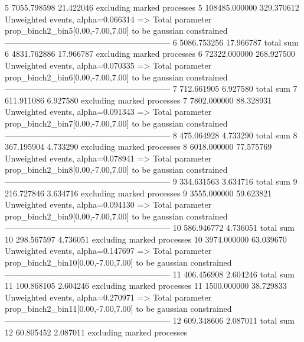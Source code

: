 5          7055.798598     21.422046       excluding marked processes    
5          108485.000000   329.370612      Unweighted events, alpha=0.066314
  => Total parameter prop_binch2_bin5[0.00,-7.00,7.00] to be gaussian constrained
------------------------------------------------------------
6          5086.753256     17.966787       total sum                     
6          4831.762886     17.966787       excluding marked processes    
6          72322.000000    268.927500      Unweighted events, alpha=0.070335
  => Total parameter prop_binch2_bin6[0.00,-7.00,7.00] to be gaussian constrained
------------------------------------------------------------
7          712.661905      6.927580        total sum                     
7          611.911086      6.927580        excluding marked processes    
7          7802.000000     88.328931       Unweighted events, alpha=0.091343
  => Total parameter prop_binch2_bin7[0.00,-7.00,7.00] to be gaussian constrained
------------------------------------------------------------
8          475.064928      4.733290        total sum                     
8          367.195904      4.733290        excluding marked processes    
8          6018.000000     77.575769       Unweighted events, alpha=0.078941
  => Total parameter prop_binch2_bin8[0.00,-7.00,7.00] to be gaussian constrained
------------------------------------------------------------
9          334.631563      3.634716        total sum                     
9          216.727846      3.634716        excluding marked processes    
9          3555.000000     59.623821       Unweighted events, alpha=0.094130
  => Total parameter prop_binch2_bin9[0.00,-7.00,7.00] to be gaussian constrained
------------------------------------------------------------
10         586.946772      4.736051        total sum                     
10         298.567597      4.736051        excluding marked processes    
10         3974.000000     63.039670       Unweighted events, alpha=0.147697
  => Total parameter prop_binch2_bin10[0.00,-7.00,7.00] to be gaussian constrained
------------------------------------------------------------
11         406.456908      2.604246        total sum                     
11         100.868105      2.604246        excluding marked processes    
11         1500.000000     38.729833       Unweighted events, alpha=0.270971
  => Total parameter prop_binch2_bin11[0.00,-7.00,7.00] to be gaussian constrained
------------------------------------------------------------
12         609.348606      2.087011        total sum                     
12         60.805452       2.087011        excluding marked processes    
